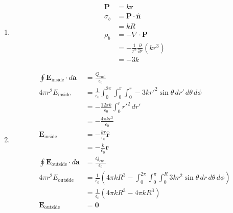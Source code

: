 \documentclass{article}
\renewcommand{\vec}[1]{\boldsymbol{\mathbf{#1}}}
\newcommand{\uvec}[1]{\hat{\vec{#1}}}
\begin{document}
\begin{enumerate}
  \item

        \begin{align*}
          \vec{P}  & = k \vec{r}                                          \\
          \sigma_b & = \vec{P} \cdot \uvec{n}                             \\
                   & = k R                                                \\
          \rho_b   & = -\nabla \cdot \vec{P}                              \\
                   & = -\frac{1}{r^2} \frac{\partial}{\partial r} (k r^3) \\
                   & = -3 k
        \end{align*}

  \item

        \begin{align*}
          \oint \vec{E}_\text{inside} \cdot d \vec{a}  & = \frac{Q_\text{encl}}{\epsilon_0}                                                                                                   \\
          4 \pi r^2 E_\text{inside}                    & = \frac{1}{\epsilon_0} \int_0^{2 \pi} \int_0^\pi \int_0^r -3 k r'^2 \sin \theta \,d r' \,d \theta \,d \phi                           \\
                                                       & = -\frac{12 \pi k}{\epsilon_0} \int_0^r r'^2 \,d r'                                                                                  \\
                                                       & = -\frac{4 \pi k r^3}{\epsilon_0}                                                                                                    \\
          \vec{E}_\text{inside}                        & = -\frac{k r}{\epsilon_0} \uvec{r}                                                                                                   \\
                                                       & = -\frac{k}{\epsilon_0} \vec{r}                                                                                                      \\
          \oint \vec{E}_\text{outside} \cdot d \vec{a} & = \frac{Q_\text{encl}}{\epsilon_0}                                                                                                   \\
          4 \pi r^2 E_\text{outside}                   & = \frac{1}{\epsilon_0} \left( 4 \pi k R^3 - \int_0^{2 \pi} \int_0^\pi \int_0^R 3 k r^2 \sin \theta \,d r \,d \theta \,d \phi \right) \\
                                                       & = \frac{1}{\epsilon_0} \left( 4 \pi k R^3 - 4 \pi k R^3 \right)                                                                      \\
          \vec{E}_\text{outside}                       & = \vec{0}
        \end{align*}
\end{enumerate}
\end{document}
